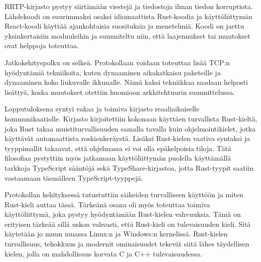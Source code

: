 \documentclass[a4paper,12pt]{article}
\begin{document}
    RRTP-kirjasto pystyy siirtämään viestejä ja tiedostoja ilman tiedon korruptiota. Lähdekoodi on suurimmaksi osaksi idiomaattista Rust-koodia ja käyttöliittymän React-koodi käyttää ajankohtaisia suosituksia ja menetelmiä.
    Koodi on jaettu yksinkertaisiin moduuleihin ja suunniteltu niin, että laajennukset tai muutokset ovat helppoja toteuttaa.\par

    Jatkokehityspolku on selkeä. Protokollaan voidaan toteuttaa lisää TCP:n hyödyntämiä tekniikoita, kuten dynaaminen aikakatkaisu paketeille ja dynaaminen koko liukuvalle ikkunalle. Nämä kaksi tekniikkaa saadaan helposti lisättyä, koska muutokset otettiin huomioon arkkitehtuurin suunnittelussa.\par

    Lopputuloksena syntyi vakaa ja toimiva kirjasto reaaliaikaiselle kommunikaatiolle. Kirjasto kirjoitettiin kokonaan käyttäen turvallista Rust-kieltä, joka 
    Rust takaa muistiturvallisuuden samalla tavalla kuin ohjelmointikielet, jotka käyttävät automaattista roskienkeräystä. Lisäksi Rust-kielen vaativa syntaksi ja
    tyyppimallit takaavat, että ohjelmassa ei voi olla epäkelpoisia tiloja.
    Tätä filosofiaa pystyttiin myös jatkamaan käyttöliittymän puolella käyttämällä
    tarkkoja TypeScript sääntöjä sekä TypeShare-kirjastoa, jotta Rust-tyypit saatiin vastaamaan täsmälleen TypeScript-tyyppejä.\par

    Protokollan kehityksessä tutustuttiin säikeiden turvalliseen käyttöön ja miten Rust-kieli auttaa tässä. Tärkeänä osana oli myös toteuttaa toimiva käyttöliittymä, joka pystyy hyödyntämään Rust-kielen vahvuuksia. Tämä on erityisen tärkeää sillä
    uskon vahvasti, että Rust-kieli on tulevaisuuden kieli. Sitä käytetään jo muun muassa Linux:n ja Windows:n kernelissä. Rust-kielen turvallisuus, tehokkuus ja modernit ominaisuudet tekevät siitä lähes täydellisen kielen, jolla on mahdollisuus korvata C ja C++ tulevaisuudessa.


    \newpage
    \printbibliography
\end{document}
